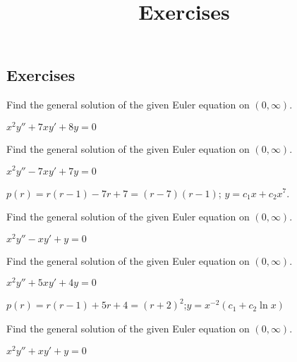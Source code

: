\documentclass{ximera}
\title{Exercises} \license{CC BY-NC-SA 4.0}
\begin{document}
\begin{abstract}
\end{abstract}
\maketitle

\begin{onlineOnly}
\section*{Exercises}
\end{onlineOnly}



\begin{problem}\label{exer:7.4.1} 
Find the general solution of
the given Euler equation on $(0,\infty)$.

$x^2y''+7xy'+8y=0$
\end{problem}

\begin{problem}\label{exer:7.4.2} 
Find the general solution of
the given Euler equation on $(0,\infty)$.

$x^2y''-7xy'+7y=0$

\begin{solution}
    $p(r)=r(r-1)-7r+7=(r-7)(r-1)$; $y=c_1x+c_2x^7$.
\end{solution}
\end{problem}


\begin{problem}\label{exer:7.4.3} 
Find the general solution of
the given Euler equation on $(0,\infty)$.

$x^2y''-xy'+y=0$
\end{problem}

\begin{problem}\label{exer:7.4.4} 
Find the general solution of
the given Euler equation on $(0,\infty)$.

$x^2y''+5xy'+4y=0$

\begin{solution}
    $p(r)=r(r-1)+5r+4=(r+2)^2$;$y=x^{-2}(c_1+c_2 \ln x)$
\end{solution}
\end{problem}

\begin{problem}\label{exer:7.4.5} 
Find the general solution of
the given Euler equation on $(0,\infty)$.

$x^2y''+xy'+y=0$
\end{problem}
\end{document}
